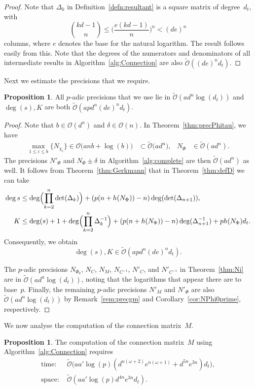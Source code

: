\documentclass[a4paper,11pt]{article}
\numberwithin{equation}{section}
\providecommand{\BigOh}{\mathcal{O}}          %
\providecommand{\SoftOh}{\tilde{\mathcal{O}}} %
\theoremstyle{definition}
\newtheorem{prop}[thm]{Proposition}
\begin{document}
\begin{proof}
Note that $\Delta_k$ in Definition~\ref{defn:resultant} is a square matrix 
of degree~$d_t$, with
\[
{kd-1 \choose n} \leq \biggl( \frac{e(kd-1)}{n} \biggr)^n < (de)^n
\]
columns, where $e$ denotes the base for the natural logarithm. The result 
follows easily from this. Note that the degrees of the numerators and 
denominators of all intermediate results in Algorithm~\ref{alg:Connection} 
are also $\SoftOh((de)^n d_t)$.
\end{proof}

Next we estimate the precisions that we require.

\begin{prop}
All $p$-adic precisions that we use lie in $\SoftOh(a d^n \log(d_t))$ 
and $\deg(s), K$ are both $\SoftOh(apd^n (de)^n d_t)$.
\end{prop}

\begin{proof}
Note that $b \in \BigOh(d^n)$ and $\delta \in \BigOh(n)$.  
In Theorem~\ref{thm:precPhitau}, we have
\begin{align*}
\max_{1 \leq i \leq b} \{N_{\chi_i}\} \in \BigOh\bigl(a n b + \log(b) \bigr) 
            &\subset \SoftOh\bigl(a d^n \bigr),
&N_{\Phi}   &\in \SoftOh(a d^n).
\end{align*}
The precisions $N'_{\Phi}$ and $N_{\Phi} \pm \delta$ in 
Algorithm~\ref{alg:complete} are then $\SoftOh(ad^n)$ as well.
It follows from Theorem~\ref{thm:Gerkmann} that in
Theorem~\ref{thm:defD} we can take
\begin{align*}
\deg{s} &\leq \deg  \Bigl( \prod_{k=2}^n \det(\Delta_k) \Bigr) + (p(n+h(N_{\Phi}))-n) \deg(\det(\Delta_{n+1})), \\
K &\leq \deg(s)+ 1+\deg \Bigl(\prod_{k=2}^n \Delta_k^{-1}\Bigr) + (p(n+h(N_{\Phi}))-n) \deg(\Delta_{n+1}^{-1}) + ph(N_{\Phi}) d_t. 
\end{align*} 
Consequently, we obtain
\[
\deg(s), K \in \SoftOh(apd^n (de)^n d_t).
\]

The $p$-adic precisions $N_{\Phi_0}$, $N_C$, $N_M$, $N_{C^{-1}}$, $N'_{C}$, 
and $N'_{C^{-1}}$ in Theorem~\ref{thm:Ni} are in $\SoftOh(ad^n \log(d_t))$, 
noting that the logarithms that appear there are to base~$p$. Finally, the 
remaining $p$-adic precisions $N'_M$ and $N'_{\Phi}$ are also 
$\SoftOh(a d^n \log(d_t))$ by Remark~\ref{rem:precgm} and 
Corollary~\ref{cor:NPhi0prime}, respectively.
\end{proof}

We now analyse the computation of the connection matrix~$M$.
\begin{prop}
The computation of the connection matrix~$M$ using 
Algorithm~\ref{alg:Connection} requires
\begin{align*}
\mbox{time: }  & \SoftOh\bigl(a a' \log(p) (d^{n(\omega+2)} e^{n(\omega+1)}+ d^{5n}e^{3n} ) d_t\bigr), \\
\mbox{space: } & \SoftOh(a a' \log(p) d^{4n}e^{3n} d_t).
\end{align*}
\end{prop}
\end{document}
